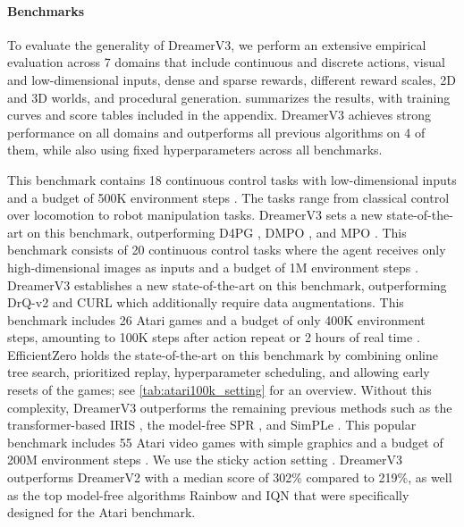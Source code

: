 \paragraph{Benchmarks}
To evaluate the generality of DreamerV3, we perform an extensive empirical evaluation across 7 domains that include continuous and discrete actions, visual and low-dimensional inputs, dense and sparse rewards, different reward scales, 2D and 3D worlds, and procedural generation.
 summarizes the results, with training curves and score tables included in the appendix.
DreamerV3 achieves strong performance on all domains and outperforms all previous algorithms on 4 of them, while also using fixed hyperparameters across all benchmarks.
\begin{itemize}
 This benchmark contains 18 continuous control tasks with low-dimensional inputs and a budget of 500K environment steps \citep{tassa2018dmcontrol}. The tasks range from classical control over locomotion to robot manipulation tasks. DreamerV3 sets a new state-of-the-art on this benchmark, outperforming D4PG \citep{barth2018d4pg}, DMPO \citep{abdolmaleki2020dmpo}, and MPO \citep{abdolmaleki2018mpo}.
 This benchmark consists of 20 continuous control tasks where the agent receives only high-dimensional images as inputs and a budget of 1M environment steps \citep{tassa2018dmcontrol,hafner2020dreamerv2}. DreamerV3 establishes a new state-of-the-art on this benchmark, outperforming DrQ-v2 \citep{yarats2021drqv2} and CURL \citep{srinivas2020curl} which additionally require data augmentations.
 This benchmark includes 26 Atari games and a budget of only 400K environment steps, amounting to 100K steps after action repeat or 2 hours of real time \citep{kaiser2019simple}. EfficientZero \citep{ye2021effzero} holds the state-of-the-art on this benchmark by combining online tree search, prioritized replay, hyperparameter scheduling, and allowing early resets of the games; see \cref{tab:atari100k_setting} for an overview. Without this complexity, DreamerV3 outperforms the remaining previous methods such as the transformer-based IRIS \citep{micheli2022iris}, the model-free SPR \citep{schwarzer2020spr}, and SimPLe \citep{kaiser2019simple}.
 This popular benchmark includes 55 Atari video games with simple graphics and a budget of 200M environment steps \citep{bellemare2013ale}. We use the sticky action setting \citep{machado2018revisiting}. DreamerV3 outperforms DreamerV2 with a median score of 302\% compared to 219\%, as well as the top model-free algorithms Rainbow \citep{hessel2018rainbow} and IQN \citep{dabney2018iqn} that were specifically designed for the Atari benchmark.

\end{itemize}
